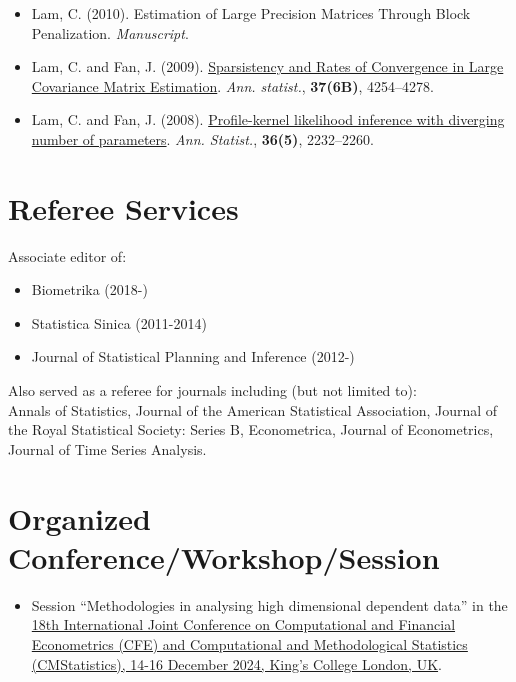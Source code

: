 \documentclass[overlapped,line,letterpaper]{res}
\begin{document}
\begin{resume}
\begin{itemize}
\vspace{12pt}
\item[$\bullet$] Lam, C. (2010). Estimation of Large
Precision Matrices Through Block Penalization. {\em Manuscript}.\\


\vspace{12pt}
\item[$\bullet$] Lam, C. and Fan, J. (2009). \href{https://cliffordlam.github.io/files/AOS720.pdf}{Sparsistency and
Rates of Convergence in Large Covariance Matrix Estimation}.
{\em Ann. statist.}, {\bf 37(6B)}, 4254--4278.\\


\vspace{12pt}
\item[$\bullet$] Lam, C. and Fan, J. (2008). \href{https://cliffordlam.github.io/files/AOS544.pdf}{Profile-kernel likelihood inference with diverging number of parameters}.
{\em  Ann. Statist.}, {\bf 36(5)}, 2232--2260.

\end{itemize}

\section{Referee Services}
Associate editor of:
\begin{itemize}
  \item[$\bullet$] Biometrika (2018-)
  \item[$\bullet$] Statistica Sinica (2011-2014)
  \item[$\bullet$] Journal of Statistical Planning and Inference (2012-)
\end{itemize}

Also served as a referee for journals including (but not limited to):\\
Annals of Statistics, Journal of the American Statistical
Association, Journal of the Royal Statistical Society: Series B,
Econometrica, Journal of Econometrics, Journal of Time Series Analysis.


\section{Organized Conference/Workshop/Session}
\begin{itemize}
  \item[$\bullet$] Session ``Methodologies in analysing high dimensional dependent data'' in the \href{https://www.cmstatistics.org/CFECMStatistics2024/organized.php}{18th International Joint Conference on Computational and Financial Econometrics (CFE) and Computational and Methodological Statistics (CMStatistics), 14-16 December 2024, King's College London, UK}.



\end{itemize}
\end{resume}
\end{document}
